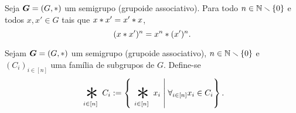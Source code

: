 \begin{comment}
\begin{proof}
Usaremos o fato de que $\opb$ é associativa. A demonstração será por indução em $n$. Se $n=1$, a afirmação é óbvia. Considere que vale para algum $n \in \N \setminus \{0\}$ e seja $\fun{\pi}{[n+1]}{[n+1]}$ uma bijeção. Definamos $k = \pi\inv(n)$ e a bijeção
	\begin{align*}
	\func{\pi'}{[n]}{[n]}{i}{
		\begin{cases}
		\pi(m)		& i<k \\
		\pi(m+1) 	& i>k.
		\end{cases}
	}
	\end{align*}
Da associatividade generalizada, da comutatividade e da hipótese para $n$, segue que
	\begin{align*}
	\bigopb_{i \in [n+1]} x_{\pi(i)}
		&= \bigopb_{i \in [n-k]} x_{\pi(i+k+1)} \opb x_{\pi(k)} \opb \bigopb_{i \in [k]} x_{\pi(i)} \\
		&= x_{n} \opb \bigopb_{i \in [n-k]} x_{\pi(i+k+1)} \opb \bigopb_{i \in [k]} x_{\pi(i)} \\
		&= x_{n} \opb \bigopb_{i \in [n-k]} x_{\pi'(i+k)} \opb \bigopb_{i \in [k]} x_{\pi'(i)} \\
		&= x_n \opb \bigopb_{i \in [n]} x_{\pi'(i)}\\
		&= x_n \opb \bigopb_{i \in [n]} x_i \\
		&= \bigopb_{i \in [n+1]} x_i.
		\qedhere
	\end{align*}
\end{proof}
\end{comment}

\begin{exercise}
Seja $\bm G=(G,\ast)$ um semigrupo (grupoide associativo). Para todo $n \in \mathbb{N} \smallsetminus \{0\}$ e todos $x,x' \in G$ tais que $x \ast x' = x' \ast x$,
	\begin{equation*}
	(x \ast x')^n = x^n \ast (x')^n.
	\end{equation*}
\end{exercise}

\begin{definition}
Sejam $\bm G=(G,\ast)$ um semigrupo (grupoide associativo), $n \in \mathbb{N} \smallsetminus \{0\}$ e $(C_i)_{i \in [n]}$ uma família de subgrupos de $G$. Define-se
	\begin{equation*}
	\bigopb _{i \in [n]} C_i := \set{\bigopb _{i \in [n]} x_i}{\forall_{i \in [n]} x_i \in C_i}.
	\end{equation*}
\end{definition}

